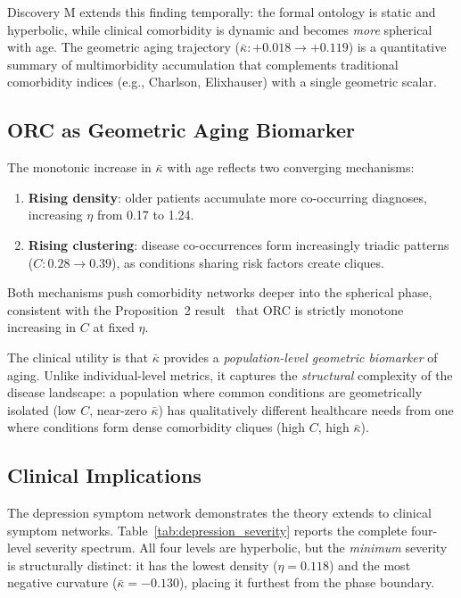 \documentclass[11pt,a4paper]{article}
\newcommand{\kbar}{\bar{\kappa}}
\begin{document}
Discovery M extends this finding temporally: the formal ontology is static and hyperbolic, while clinical comorbidity is dynamic and becomes \emph{more} spherical with age. The geometric aging trajectory ($\kbar: +0.018 \to +0.119$) is a quantitative summary of multimorbidity accumulation that complements traditional comorbidity indices (e.g., Charlson, Elixhauser) with a single geometric scalar.

\subsection{ORC as Geometric Aging Biomarker}

The monotonic increase in $\kbar$ with age reflects two converging mechanisms:
\begin{enumerate}
    \item \textbf{Rising density}: older patients accumulate more co-occurring diagnoses, increasing $\eta$ from 0.17 to 1.24.
    \item \textbf{Rising clustering}: disease co-occurrences form increasingly triadic patterns ($C: 0.28 \to 0.39$), as conditions sharing risk factors create cliques.
\end{enumerate}
Both mechanisms push comorbidity networks deeper into the spherical phase, consistent with the Proposition~2 result~\cite{agourakis2026semantic} that ORC is strictly monotone increasing in $C$ at fixed $\eta$.

The clinical utility is that $\kbar$ provides a \emph{population-level geometric biomarker} of aging. Unlike individual-level metrics, it captures the \emph{structural} complexity of the disease landscape: a population where common conditions are geometrically isolated (low $C$, near-zero $\kbar$) has qualitatively different healthcare needs from one where conditions form dense comorbidity cliques (high $C$, high $\kbar$).

\subsection{Clinical Implications}

The depression symptom network demonstrates the theory extends to clinical symptom networks. Table~\ref{tab:depression_severity} reports the complete four-level severity spectrum. All four levels are hyperbolic, but the \emph{minimum} severity is structurally distinct: it has the lowest density ($\eta=0.118$) and the most negative curvature ($\kbar=-0.130$), placing it furthest from the phase boundary.
\end{document}
